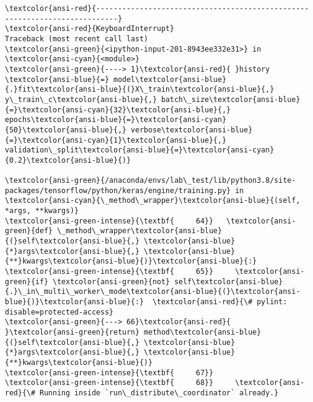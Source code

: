 \documentclass[11pt]{article}
\begin{document}
    \begin{Verbatim}[commandchars=\\\{\}, frame=single, framerule=2mm, rulecolor=\color{outerrorbackground}]
\textcolor{ansi-red}{---------------------------------------------------------------------------}
\textcolor{ansi-red}{KeyboardInterrupt}                         Traceback (most recent call last)
\textcolor{ansi-green}{<ipython-input-201-8943ee332e31>} in \textcolor{ansi-cyan}{<module>}
\textcolor{ansi-green}{----> 1}\textcolor{ansi-red}{ }history \textcolor{ansi-blue}{=} model\textcolor{ansi-blue}{.}fit\textcolor{ansi-blue}{(}X\_train\textcolor{ansi-blue}{,} y\_train\_c\textcolor{ansi-blue}{,} batch\_size\textcolor{ansi-blue}{=}\textcolor{ansi-cyan}{32}\textcolor{ansi-blue}{,} epochs\textcolor{ansi-blue}{=}\textcolor{ansi-cyan}{50}\textcolor{ansi-blue}{,} verbose\textcolor{ansi-blue}{=}\textcolor{ansi-cyan}{1}\textcolor{ansi-blue}{,} validation\_split\textcolor{ansi-blue}{=}\textcolor{ansi-cyan}{0.2}\textcolor{ansi-blue}{)}

\textcolor{ansi-green}{/anaconda/envs/lab\_test/lib/python3.8/site-packages/tensorflow/python/keras/engine/training.py} in \textcolor{ansi-cyan}{\_method\_wrapper}\textcolor{ansi-blue}{(self, *args, **kwargs)}
\textcolor{ansi-green-intense}{\textbf{     64}}   \textcolor{ansi-green}{def} \_method\_wrapper\textcolor{ansi-blue}{(}self\textcolor{ansi-blue}{,} \textcolor{ansi-blue}{*}args\textcolor{ansi-blue}{,} \textcolor{ansi-blue}{**}kwargs\textcolor{ansi-blue}{)}\textcolor{ansi-blue}{:}
\textcolor{ansi-green-intense}{\textbf{     65}}     \textcolor{ansi-green}{if} \textcolor{ansi-green}{not} self\textcolor{ansi-blue}{.}\_in\_multi\_worker\_mode\textcolor{ansi-blue}{(}\textcolor{ansi-blue}{)}\textcolor{ansi-blue}{:}  \textcolor{ansi-red}{\# pylint: disable=protected-access}
\textcolor{ansi-green}{---> 66}\textcolor{ansi-red}{       }\textcolor{ansi-green}{return} method\textcolor{ansi-blue}{(}self\textcolor{ansi-blue}{,} \textcolor{ansi-blue}{*}args\textcolor{ansi-blue}{,} \textcolor{ansi-blue}{**}kwargs\textcolor{ansi-blue}{)}
\textcolor{ansi-green-intense}{\textbf{     67}} 
\textcolor{ansi-green-intense}{\textbf{     68}}     \textcolor{ansi-red}{\# Running inside `run\_distribute\_coordinator` already.}


\end{Verbatim}
\end{document}
